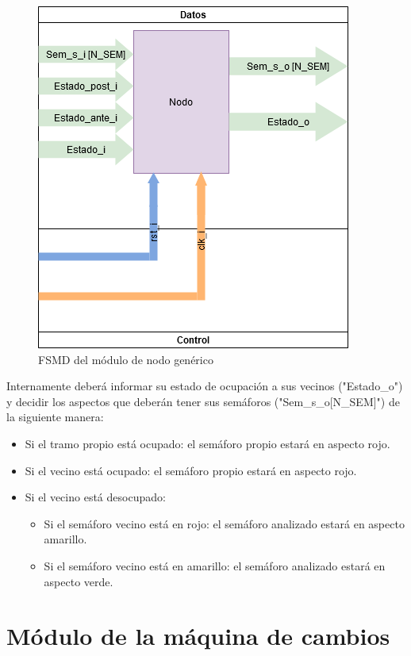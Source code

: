 	\begin{figure}[h]
	\centering
	\includegraphics[scale=.5]{./Figures/FSMD-Nodo}
		\caption{FSMD del módulo de nodo genérico}
		\label{fig:FSMD_Nodo}
	\end{figure}		
	
	
	Internamente deberá informar su estado de ocupación a sus vecinos ("Estado\_o") y decidir los aspectos que deberán tener sus semáforos ("Sem\_s\_o[N\_SEM]") de la siguiente manera:
			
	\begin{itemize}
		\item Si el tramo propio está ocupado: el semáforo propio estará en aspecto rojo.
		\item Si el vecino está ocupado: el semáforo propio estará en aspecto rojo.
		\item Si el vecino está desocupado:
		\begin{itemize}
			\item Si el semáforo vecino está en rojo: el semáforo analizado estará en aspecto amarillo.
			\item Si el semáforo vecino está en amarillo:  el semáforo analizado estará en aspecto verde.
		\end{itemize}				 
	\end{itemize}
	
\section{Módulo de la máquina de cambios}

